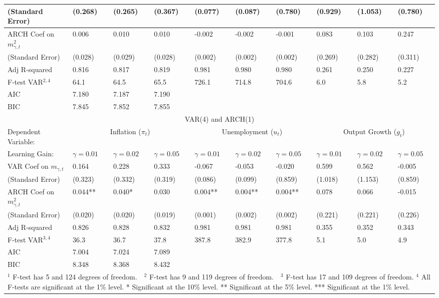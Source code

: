 \documentclass[12pt]{article}
\begin{document}
\begin{sidewaystable}
\begin{small}
\begin{center}
\begin{tabular}{l|p{0.64in} p{0.64in} p{0.64in}|p{0.64in} p{0.64in} p{0.64in}|p{0.64in} p{0.64in} p{0.64in}}
(Standard Error) & (0.268) & (0.265) & (0.367) & (0.077) & (0.087) & (0.780) & (0.929) & (1.053) & (0.780) \\ \hline
ARCH Coef on $m_{\gamma,t}^2$ & 0.006 & 0.010 & 0.010 & -0.002 & -0.002 & -0.001 & 0.083 & 0.103 & 0.247 \\
(Standard Error) & (0.028) & (0.029) & (0.028) & (0.002) & (0.002) & (0.002) & (0.269) & (0.282) & (0.311) \\ \hline
Adj R-squared & 0.816 & 0.817 & 0.819 & 0.981 & 0.980 & 0.980 & 0.261 & 0.250 & 0.227 \\ 
F-test VAR$^{2,4}$ & 64.1 & 64.5 & 65.5 & 726.1 & 714.8 & 704.6 & 6.0 & 5.8 & 5.2 \\ 
AIC & 7.180 & 7.187 & 7.190   & & &   & & & \\ 
BIC & 7.845 & 7.852 & 7.855   & & &   & & & \\ \hline \hline
\multicolumn{10}{c}{VAR(4) and ARCH(1)} \\ \hline \hline
Dependent Variable:  & \multicolumn{3}{c|}{Inflation ($\pi_t$)} & \multicolumn{3}{c|}{Unemployment ($u_t$)} &  \multicolumn{3}{c}{Output Growth ($g_t$)} \\ \hline
Learning Gain: & $\gamma=0.01$ & $\gamma=0.02$ & $\gamma=0.05$ & $\gamma=0.01$ & $\gamma=0.02$ & $\gamma=0.05$& $\gamma=0.01$ & $\gamma=0.02$ & $\gamma=0.05$ \\ \hline
VAR Coef on $m_{\gamma,t}$ & 0.164 & 0.228 & 0.333 & -0.067 & -0.053 & -0.020 & 0.599 & 0.562 & -0.005 \\
(Standard Error) & (0.323) & (0.332) & (0.319) & (0.086) & (0.099) & (0.859) & (1.018) & (1.153) & (0.859) \\ \hline
ARCH Coef on $m_{\gamma,t}^2$ & 0.044** & 0.040* & 0.030 & 0.004** & 0.004** & 0.004** & 0.078 & 0.066 & -0.015 \\
(Standard Error) & (0.020) & (0.020) & (0.019) & (0.001) & (0.002) & (0.002) & (0.221) & (0.221) & (0.226) \\ \hline
Adj R-squared & 0.826 & 0.828 & 0.832 & 0.981 & 0.981 & 0.981 & 0.355 & 0.352 & 0.343 \\ 
F-test VAR$^{3,4}$ & 36.3 & 36.7 & 37.8 & 387.8 & 382.9 & 377.8 & 5.1 & 5.0 & 4.9 \\ 
AIC & 7.004 & 7.024 & 7.089   & & &   & & & \\ 
BIC & 8.348 & 8.368 & 8.432   & & &   & & & \\ \hline \hline
\multicolumn{10}{p{8.7in}}{$^1$ F-test has 5 and 124 degrees of freedom.~~$^2$ F-test has 9 and 119 degrees of freedom.~~$^3$ F-test has 17 and 109 degrees of freedom.\newline
$^4$ All F-tests are significant at the 1\% level. \newline
* Significant at the 10\% level.  ** Significant at the 5\% level.  *** Significant at the 1\% level.}\\
\end{tabular}
\end{center}
\end{small}
\end{sidewaystable}
\end{document}
